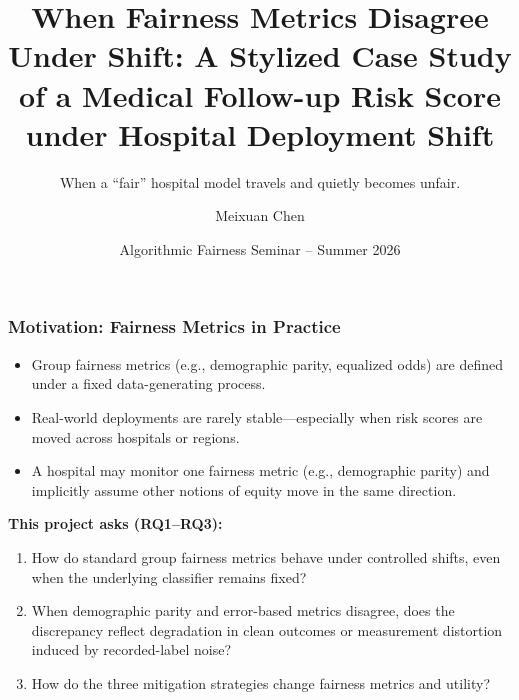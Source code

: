 \documentclass{beamer}
\title[Fairness Metrics Under Shift]
{When Fairness Metrics Disagree Under Shift: A Stylized Case Study of a Medical Follow-up Risk Score under Hospital Deployment Shift}
\subtitle{When a ``fair'' hospital model travels and quietly becomes unfair.}
\author[Group 0]{Meixuan Chen}
\institute[ ]{Department of Electrical and Computer Engineering}
\date[Algorithmic Fairness] 
{Algorithmic Fairness Seminar -- Summer 2026}
\begin{document}
\frame{\titlepage}


\begin{frame}
\frametitle{Motivation: Fairness Metrics in Practice}

\begin{itemize}
    \item Group fairness metrics (e.g., demographic parity, equalized odds) are \alert{defined under a fixed data-generating process}.
    \item Real-world deployments are rarely stable---especially when risk scores are moved across hospitals or regions.
    \item A hospital may monitor \alert{one} fairness metric (e.g., demographic parity) and implicitly assume other notions of equity move in the same direction.
\end{itemize}

\vspace{0.15cm}

\small
\textbf{This project asks (RQ1--RQ3):}
\begin{enumerate}
    \item How do standard group fairness metrics behave under controlled shifts, even when the underlying classifier remains fixed?
    \item When demographic parity and error-based metrics disagree, does the discrepancy reflect degradation in clean outcomes or measurement distortion induced by recorded-label noise?
    \item How do the three mitigation strategies change fairness metrics and utility?
\end{enumerate}

\end{frame}
\end{document}
